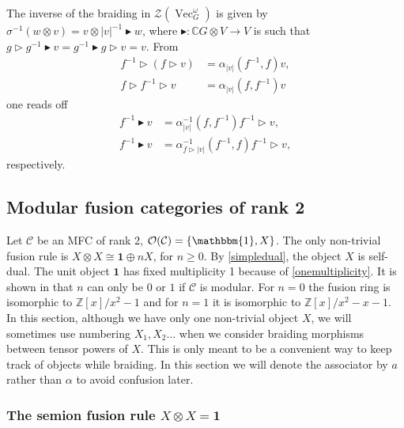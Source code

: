 \documentclass[11pt]{book}
\theoremstyle{Rem}
\theoremstyle{definition}
\numberwithin{equation}{section}
\newcommand\hit{\triangleright}
\newcommand\bhit{\blacktriangleright}
\newcommand\inv{^{-1}}
\newcommand\ot{\otimes}
\newcommand\Vect{\operatorname{Vec}}
\newcommand\CC{\mathbb C}
\newcommand\Z{\mathbb Z}
\newcommand\Cat{\mathcal C}
\newcommand\OO{\mathcal O}
\newcommand\CTR{\mathcal Z}
\newcommand\one{\mathbf{1}}
\begin{document}
The inverse of the braiding in $\CTR(\Vect_G^\omega)$ is given by $\sigma\inv(w\ot v)=v\ot |v|\inv\bhit w$, where $\bhit\colon\CC G\otimes V\to V$ is such that $g\hit g\inv\bhit v=g\inv\bhit g\hit v=v$. From
\begin{align*}
  f\inv \hit (f \hit v) &= \alpha_{|v|}(f\inv, f) v,\\
  f\hit f\inv\hit v&=\alpha_{|v|}(f,f\inv)v
\end{align*}
one reads off
\begin{align}\label{blackhit}
f\inv\bhit v&=\alpha_{|v|}\inv(f,f\inv) f\inv\hit v,\\
  f\inv\bhit v&=\alpha_{f\hit|v|}\inv(f\inv,f) f\inv\hit v,
\end{align}
respectively.


\iffalse

\subsection{Modular fusion categories of rank 2}
Let $\Cat$ be an MFC of rank 2, $\OO(\Cat) =\{ \mathbbm{1},X\}$. The only non-trivial fusion rule is $X\otimes X \cong \one \oplus nX$, for $n\geq 0$.  By \ref{simpledual}, the object $X$ is self-dual. The unit object $\one$ has fixed multiplicity 1 because of \ref{onemultiplicity}.
It is shown in \cite{O} that $n$ can only be $0$ or $1$ if $\Cat$ is modular. For $n=0$ the fusion ring is isomorphic to $\Z[x]/x^2-1$ and for $n=1$ it is isomorphic to $\Z[x]/x^2 -x -1$.
In this section, although we have only one non-trivial object $X$, we will sometimes use numbering $X_1, X_2 \dots$ when we consider braiding morphisms between tensor powers of $X$. This is only meant to be a convenient way to keep track of objects while braiding. In this section we will denote the associator by $a$ rather than $\alpha$ to avoid confusion later.

\subsubsection{The semion fusion rule $X\otimes X = \one$}\label{semion}
\end{document}
